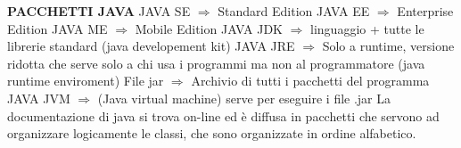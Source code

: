 \noindent \textbf{PACCHETTI JAVA}\newline
JAVA SE $\Rightarrow$ Standard Edition \newline
JAVA EE $\Rightarrow$ Enterprise Edition \newline
JAVA ME $\Rightarrow$ Mobile Edition \newline
JAVA JDK $\Rightarrow$ linguaggio + tutte le librerie standard (java developement kit) \newline
JAVA JRE $\Rightarrow$ Solo a runtime, versione ridotta che serve solo a chi usa i programmi ma non al programmatore (java runtime enviroment) \newline
File jar  $\Rightarrow$ Archivio di tutti i pacchetti del programma \newline
JAVA JVM $\Rightarrow$ (Java virtual machine) serve per eseguire i file .jar \newline
La documentazione di java si trova on-line ed è diffusa in pacchetti che servono ad organizzare logicamente le classi, che sono organizzate in ordine alfabetico. \newline





\newpage










